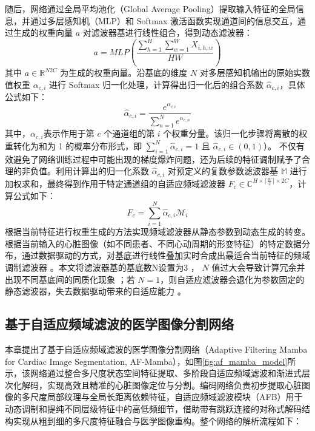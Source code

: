 \documentclass[12pt, a4paper, twoside]{article}
\begin{document}
随后，网络通过全局平均池化（Global Average Pooling）提取输入特征的全局信息，并通过多层感知机（MLP）和 Softmax 激活函数实现通道间的信息交互，通过生成的权重向量 $a$ 对滤波器基进行线性组合，得到动态滤波器：
\begin{equation}
a=MLP(\frac{\sum_{h=1}^{H}\sum_{w=1}^{W}X_{i,h,w}}{HW})
\end{equation}
其中 $a \in \mathbb{R}^{N2C}$ 为生成的权重向量。沿基底的维度 $N$ 对多层感知机输出的原始实数值权重 $\alpha_{c,i}$ 进行 Softmax 归一化处理，计算得出归一化后的组合系数 $\hat{\alpha}_{c,i}$，具体公式如下：
\begin{equation}
\hat{\alpha}_{c,i} = \frac{e^{\alpha_{c,i}}}{\sum_{n=1}^{N}e^{\alpha_{c,n}}}
\end{equation}
其中，$\alpha_{c,i}$表示作用于第 $c$ 个通道组的第 $i$ 个权重分量。该归一化步骤将离散的权重转化为和为 1 的概率分布形式，即 $\sum_{i=1}^{N}\hat{\alpha}_{c,i}=1$ 且 $\hat{\alpha}_{c,i} \in (0,1)$）。
不仅有效避免了网络训练过程中可能出现的梯度爆炸问题，还为后续的特征调制赋予了合理的非负值。利用计算出的归一化系数 $\hat{\alpha}_{c,i}$ 对预定义的复数参数滤波器基 $\mathbb{M}$ 进行加权求和，最终得到作用于特定通道组的自适应频域滤波器 $F_{c} \in \mathbb{C}^{H \times \lceil\frac{W}{2}\rceil \times 2C}$，计算公式如下：
\begin{equation}
F_{c} = \sum_{i=1}^{N} \hat{\alpha}_{c,i} \mathcal{M}_{i}
\end{equation}
根据当前特征进行权重生成的方法实现频域滤波器从静态参数到动态生成的转变。根据当前输入的心脏图像（如不同患者、不同心动周期的形变特征）的特定数据分布，通过数据驱动的方式，对基底进行线性叠加实时合成出最适合当前特征的频域调制滤波器 。本文将滤波器基的基底数N设置为3 ， $N$ 值过大会导致计算冗余并出现不同基底间的同质化现象 ；若 $N=1$，则自适应滤波器会退化为参数固定的静态滤波器，失去数据驱动带来的自适应能力 。

\subsection{基于自适应频域滤波的医学图像分割网络}

本章提出了基于自适应频域滤波的医学图像分割网络（Adaptive Filtering Mamba for Cardiac Image Segmentation, AF-Mamba），如图\ref{fig:af_mamba_model}所示，该网络通过整合多尺度状态空间特征提取、多阶段自适应频域滤波和渐进式层次化解码，实现高效且精准的心脏图像定位与分割。编码网络负责初步提取心脏图像的多尺度局部纹理与全局长距离依赖特征，自适应频域滤波模块（AFB）用于动态调制和提纯不同层级特征中的高低频细节，借助带有跳跃连接的对称式解码结构实现从粗到细的多尺度特征融合与医学图像重构。整个网络的解析流程如下：
\end{document}

